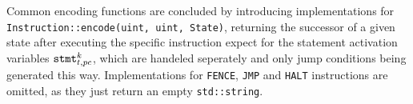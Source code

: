 \noindent
Common encoding functions are concluded by introducing implementations for \lstinline[style=c++, basicstyle=\normalsize\ttfamily]{Instruction::encode(uint, uint, State)}, returning the successor of a given state after executing the specific instruction expect for the statement activation variables $\texttt{stmt}^k_{t, pc}$, which are handeled seperately and only jump conditions being generated this way.
Implementations for \lstinline[language={[concubine]Assembler}]{FENCE}, \lstinline[language={[concubine]Assembler}]{JMP} and \lstinline[language={[concubine]Assembler}]{HALT} instructions are omitted, as they just return an empty \lstinline[style=c++]{std::string}.

\newpage


\newcommand{\defencode}[1]{
  \vfill
  \par\noindent
  #1
  \par\noindent
  \rule[0.5\baselineskip]{\textwidth}{0.1pt}%
}

\newlength{\encodeskip}
\setlength{\encodeskip}{.5\baselineskip}

